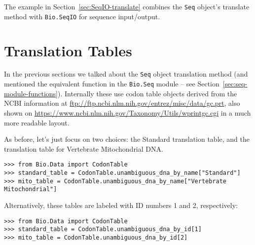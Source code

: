 The example in Section~\ref{sec:SeqIO-translate} combines the \verb|Seq| object's
translate method with \verb|Bio.SeqIO| for sequence input/output.

\section{Translation Tables}

In the previous sections we talked about the \verb|Seq| object translation method (and mentioned the equivalent function in the \verb|Bio.Seq| module -- see
Section~\ref{sec:seq-module-functions}).
Internally these use codon table objects derived from the NCBI information at
\url{ftp://ftp.ncbi.nlm.nih.gov/entrez/misc/data/gc.prt}, also shown on
\url{https://www.ncbi.nlm.nih.gov/Taxonomy/Utils/wprintgc.cgi} in a much more readable layout.

As before, let's just focus on two choices: the Standard translation table, and the
translation table for Vertebrate Mitochondrial DNA.

\begin{verbatim}
>>> from Bio.Data import CodonTable
>>> standard_table = CodonTable.unambiguous_dna_by_name["Standard"]
>>> mito_table = CodonTable.unambiguous_dna_by_name["Vertebrate Mitochondrial"]
\end{verbatim}

Alternatively, these tables are labeled with ID numbers 1 and 2, respectively:

\begin{verbatim}
>>> from Bio.Data import CodonTable
>>> standard_table = CodonTable.unambiguous_dna_by_id[1]
>>> mito_table = CodonTable.unambiguous_dna_by_id[2]
\end{verbatim}

